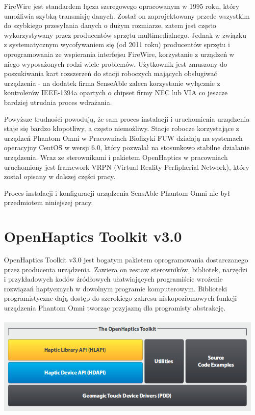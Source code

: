 \documentclass[licencjacka]{pracamgr}
\begin{document}
FireWire jest standardem łącza szeregowego opracowanym w 1995 roku, który umożliwia szybką transmisję danych. Został on zaprojektowany przede wszystkim do szybkiego przesyłania danych o dużym rozmiarze, zatem jest często wykorzystywany przez producentów sprzętu multimedialnego. Jednak w związku z systematycznym wycofywaniem się (od 2011 roku) producentów sprzętu i oprogramowania ze wspierania interfejsu FireWire, korzystanie z urządzeń w niego wyposażonych rodzi wiele problemów. Użytkownik jest zmuszony do poszukiwania kart rozszerzeń do stacji roboczych mających obsługiwać urządzenia - na dodatek firma SenseAble zaleca korzystanie wyłącznie z kontrolerów IEEE-1394a opartych o chipset firmy NEC lub VIA co jeszcze bardziej utrudnia proces wdrażania.

Powyższe trudności powodują, że sam proces instalacji i uruchomienia urządzenia staje się bardzo kłopotliwy, a często niemożliwy. Stacje robocze korzystające z urządzeń Phantom Omni w Pracowniach Biofizyki FUW działają na systemach operacyjny CentOS w wersji 6.0, który pozwalał na stosunkowo stabilne działanie urządzenia. Wraz ze sterownikami i pakietem OpenHaptics w pracowniach uruchomiony jest framework VRPN (Virtual Reality Perfipherial Network), który został opisany w dalszej części pracy.

Proces instalacji i konfiguracji urządzenia SensAble Phantom Omni nie był przedmiotem niniejszej pracy.

\section{OpenHaptics Toolkit v3.0}

OpenHaptics Toolkit v3.0 jest bogatym pakietem oprogramowania dostarczanego przez producenta urządzenia. Zawiera on zestaw sterowników, bibliotek, narzędzi i przykładowych kodów źródłowych ułatwiających programiście wrożenie rozwiązań haptycznych w dowolnym programie komputerowym. Biblioteki programistyczne dają dostęp do szerokiego zakresu niskopoziomowych funkcji urządzenia Phantom Omni tworząc przyjazną dla programisty abstrakcję. 
\\
\\
\includegraphics[scale=0.5,center]{openhaptics}
\\
\\
\end{document}
